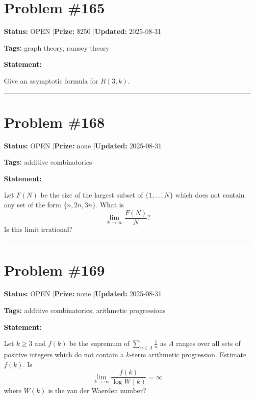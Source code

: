 \documentclass{article}
\begin{document}
\section{Problem \#165}
\label{prob:165}

\noindent\textbf{Status:} OPEN \quad|\quad \textbf{Prize:} \$250 \quad|\quad \textbf{Updated:} 2025-08-31

\noindent\textbf{Tags:} graph theory, ramsey theory

\medskip

\noindent\textbf{Statement:}

Give an asymptotic formula for $R(3,k)$.

\noindent\rule{\linewidth}{0.4pt}


\section{Problem \#168}
\label{prob:168}

\noindent\textbf{Status:} OPEN \quad|\quad \textbf{Prize:} none \quad|\quad \textbf{Updated:} 2025-08-31

\noindent\textbf{Tags:} additive combinatorics

\medskip

\noindent\textbf{Statement:}

Let $F(N)$ be the size of the largest subset of $\{1,\ldots,N\}$ which does not contain any set of the form $\{n,2n,3n\}$. What is\[ \lim_{N\to \infty}\frac{F(N)}{N}?\]Is this limit irrational?

\noindent\rule{\linewidth}{0.4pt}


\section{Problem \#169}
\label{prob:169}

\noindent\textbf{Status:} OPEN \quad|\quad \textbf{Prize:} none \quad|\quad \textbf{Updated:} 2025-08-31

\noindent\textbf{Tags:} additive combinatorics, arithmetic progressions

\medskip

\noindent\textbf{Statement:}

Let $k\geq 3$ and $f(k)$ be the supremum of $\sum_{n\in A}\frac{1}{n}$ as $A$ ranges over all sets of positive integers which do not contain a $k$-term arithmetic progression. Estimate $f(k)$. Is\[\lim_{k\to \infty}\frac{f(k)}{\log W(k)}=\infty\]where $W(k)$ is the van der Waerden number?
\end{document}

